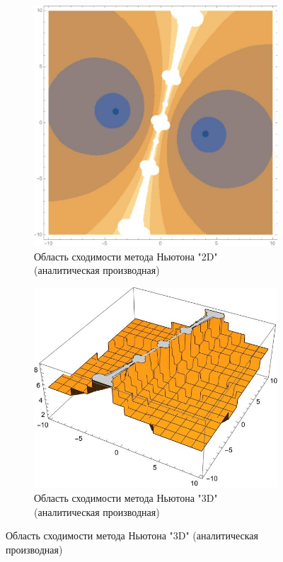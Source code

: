 \documentclass[12pt, a4paper]{article}
\begin{document}
	\begin{figure}[H]
	\centering
	\begin{subfigure}{0.45\textwidth}
		\includegraphics[width=\textwidth]{2D4ch}
		\caption{Область сходимости метода Ньютона "2D" (аналитическая производная)}
	\end{subfigure}
	\hfill
	\begin{subfigure}{0.45\textwidth}
		\includegraphics[width=\textwidth]{3D4ch}
		\caption{Область сходимости метода Ньютона "3D" (аналитическая производная)}
	\end{subfigure}
\end{figure}
	
\end{document}
